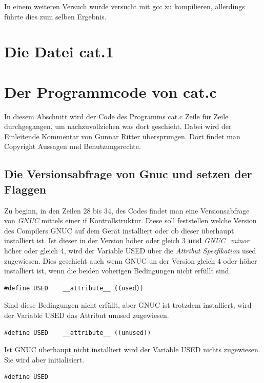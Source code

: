 In einem weiteren Versuch wurde versucht mit gcc zu kompilieren, allerdings führte dies zum selben Ergebnis.

\section{Die Datei cat.1}



\section{Der Programmcode von cat.c}
In diesem Abschnitt wird der Code des Programms cat.c Zeile für Zeile durchgegangen, um nachzuvollziehen was dort geschieht. Dabei wird der Einleitende Kommentar von Gunnar Ritter übersprungen. Dort findet man Copyright Aussagen und Benutzungsrechte.

\subsection{Die Versionsabfrage von Gnuc und setzen der Flaggen}
Zu beginn, in den Zeilen 28 bis 34, des Codes findet man eine Versionsabfrage von \textit{GNUC} mittels einer if Kontrollstruktur. Diese soll feststellen welche Version des Compilers GNUC auf dem Gerät installiert oder ob dieser überhaupt installiert ist. Ist dieser in der Version höher oder gleich 3 \textbf{und} \textit{GNUC\_minor} höher oder gleich 4, wird der Variable USED über die \textit{Attribut Spezfikation} used zugewiesen. Dies geschieht auch wenn GNUC un der Version gleich 4 oder höher installiert ist, wenn die beiden voherigen Bedingungen nicht erfüllt sind.

\begin{lstlisting}
#define USED	__attribute__ ((used))
\end{lstlisting}

Sind diese Bedingungen nicht erfüllt, aber GNUC ist trotzdem installiert, wird der Variable USED das Attribut unused zugewiesen.

\begin{lstlisting}
#define USED	__attribute__ ((unused))
\end{lstlisting}

Ist GNUC überhaupt nicht installiert wird der Variable USED nichts zugewiesen. Sie wird aber initialisiert.

\begin{lstlisting}
#define USED
\end{lstlisting}

